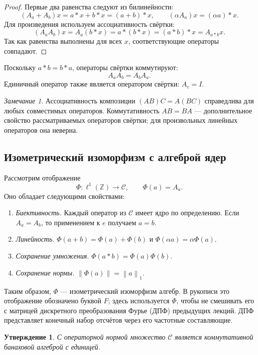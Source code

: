 \documentclass[12pt,a4paper]{article}
\newtheorem{proposition}{Утверждение}
\theoremstyle{definition}
\theoremstyle{remark}
\newtheorem*{remark}{Замечание}
\newcommand{\ZZ}{\mathbb{Z}}
\newcommand{\norm}[1]{\left\lVert #1\right\rVert}
\newcommand{\Conv}{\mathcal C}
\begin{document}
\begin{proof}
Первые два равенства следуют из билинейности:
\[
  (A_a+A_b)x=a*x+b*x=(a+b)*x,
  \qquad (\alpha A_a)x=(\alpha a)*x.
\]
Для произведения используем ассоциативность свёртки:
\[
  (A_aA_b)x=A_a(b*x)=a*(b*x)=(a*b)*x=A_{a*b}x.
\]
Так как равенства выполнены для всех $x$, соответствующие операторы
совпадают.
\end{proof}

Поскольку $a*b=b*a$, операторы свёртки коммутируют:
\[
  A_aA_b=A_bA_a.
\]
Единичный оператор также является оператором свёртки: $A_e=I$.

\begin{remark}
Ассоциативность композиции $(AB)C=A(BC)$ справедлива для любых
совместимых операторов. Коммутативность $AB=BA$ --- дополнительное
свойство рассматриваемых операторов свёртки; для произвольных
линейных операторов она неверна.
\end{remark}

\subsection{Изометрический изоморфизм с алгеброй ядер}

Рассмотрим отображение
\[
  \Phi\colon\ell^1(\ZZ)\longrightarrow\Conv,\qquad\Phi(a)=A_a.
\]
Оно обладает следующими свойствами:
\begin{enumerate}
  \item \emph{Биективность.} Каждый оператор из $\Conv$ имеет ядро
        по определению. Если $A_a=A_b$, то применением к $e$ получаем
        $a=b$.
  \item \emph{Линейность.}
        $\Phi(a+b)=\Phi(a)+\Phi(b)$ и
        $\Phi(\alpha a)=\alpha\Phi(a)$.
  \item \emph{Сохранение умножения.}
        $\Phi(a*b)=\Phi(a)\Phi(b)$.
  \item \emph{Сохранение нормы.}
        $\norm{\Phi(a)}=\norm{a}_1$.
\end{enumerate}
Таким образом, $\Phi$ --- изометрический изоморфизм алгебр.
В рукописи это отображение обозначено буквой $F$; здесь используется
$\Phi$, чтобы не смешивать его с матрицей дискретного преобразования
Фурье (ДПФ) предыдущих лекций. ДПФ представляет конечный набор
отсчётов через его частотные составляющие.

\begin{proposition}
С операторной нормой множество $\Conv$ является коммутативной
банаховой алгеброй с единицей.
\end{proposition}
\end{document}
